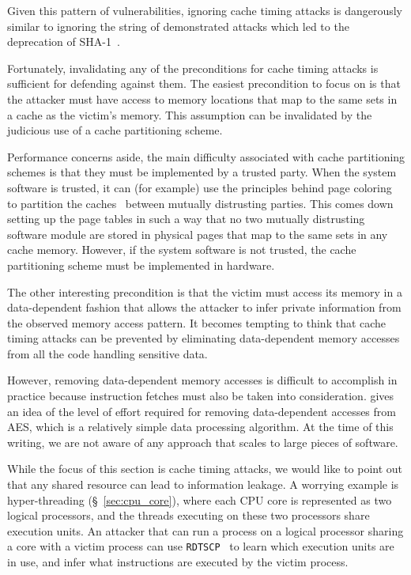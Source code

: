 Given this pattern of vulnerabilities, ignoring cache timing attacks is
dangerously similar to ignoring the string of demonstrated attacks which led to
the deprecation of SHA-1~\cite{nist2014sha1policy, google2014sha1deprecation,
microsoft2014sha1deprecation}.


\label{sec:cache_timing_workarounds}

Fortunately, invalidating any of the preconditions for cache timing attacks is
sufficient for defending against them. The easiest precondition to focus on is
that the attacker must have access to memory locations that map to the same
sets in a cache as the victim's memory. This assumption can be invalidated by
the judicious use of a cache partitioning scheme.

Performance concerns aside, the main difficulty associated with cache
partitioning schemes is that they must be implemented by a trusted party. When
the system software is trusted, it can (for example) use the principles behind
page coloring~\cite{taylor1990coloring, kessler1992coloring} to partition the
caches~\cite{lin2008coloring} between mutually distrusting parties. This comes
down setting up the page tables in such a way that no two mutually distrusting
software module are stored in physical pages that map to the same sets in any
cache memory.  However, if the system software is not trusted, the cache
partitioning scheme must be implemented in hardware.

The other interesting precondition is that the victim must access its memory in
a data-dependent fashion that allows the attacker to infer private information
from the observed memory access pattern. It becomes tempting to think that
cache timing attacks can be prevented by eliminating data-dependent memory
accesses from all the code handling sensitive data.

However, removing data-dependent memory accesses is difficult to accomplish in
practice because instruction fetches must also be taken into consideration.
\cite{kasper2009aes} gives an idea of the level of effort required for removing
data-dependent accesses from AES, which is a relatively simple data processing
algorithm. At the time of this writing, we are not aware of any approach that
scales to large pieces of software.

While the focus of this section is cache timing attacks, we would like to point
out that any shared resource can lead to information leakage. A worrying
example is hyper-threading (\S~\ref{sec:cpu_core}), where each CPU core is
represented as two logical processors, and the threads executing on these two
processors share execution units. An attacker that can run a process on a
logical processor sharing a core with a victim process can use
\texttt{RDTSCP}~\cite{petters1999making} to learn which execution units are in
use, and infer what instructions are executed by the victim process.

